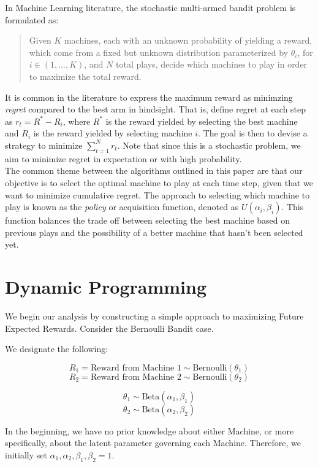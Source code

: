 \documentclass{article}
\begin{document}
In Machine Learning literature, the stochastic multi-armed bandit problem is formulated as:

\begin{quote}
Given $K$ machines, each with an unknown probability of yielding a reward, which come from a fixed but unknown distribution parameterized by $\theta_i$, for $i \in (1, ..., K)$, and $N$ total plays, decide which machines to play in order to maximize the total reward.
\end{quote}

It is common in the literature to express the maximum reward as minimzing \textit{regret} compared to the best arm in hindsight. That is, define regret at each step as $r_{t} = R^* - R_{i}$, where $R^*$ is the reward yielded by selecting the best machine and $R_{i}$ is the reward yielded by selecting machine $i$. The goal is then to devise a strategy to minimize $\sum_{t=1}^N r_{t}$. Note that since this is a stochastic problem, we aim to minimize regret in expectation or with high probability.\\

The common theme between the algorithms outlined in this paper are that our objective is to select the optimal machine to play at each time step, given that we want to minimize cumulative regret. The approach to selecting which machine to play is known as the \textit{policy} or acquisition function, denoted as $U(\alpha_i, \beta_i)$. This function balances the trade off between selecting the best machine based on previous plays and the possibility of a better machine that hasn't been selected yet.

\section{Dynamic Programming}


We begin our analysis by constructing a simple approach to maximizing Future Expected Rewards. Consider the Bernoulli Bandit case.

We designate the following:

$$R_1 = \text{Reward from Machine 1} \sim \text{Bernoulli}(\theta_1)$$
$$R_2 = \text{Reward from Machine 2} \sim \text{Bernoulli}(\theta_2)$$

$$\theta_1 \sim \text{Beta}(\alpha_1, \beta_1)$$
$$\theta_2 \sim \text{Beta}(\alpha_2, \beta_2)$$

In the beginning, we have no prior knowledge about either Machine, or more specifically, about the latent parameter governing each Machine. Therefore, we initially set $\alpha_1, \alpha_2, \beta_1, \beta_2 = 1$. 
\end{document}
